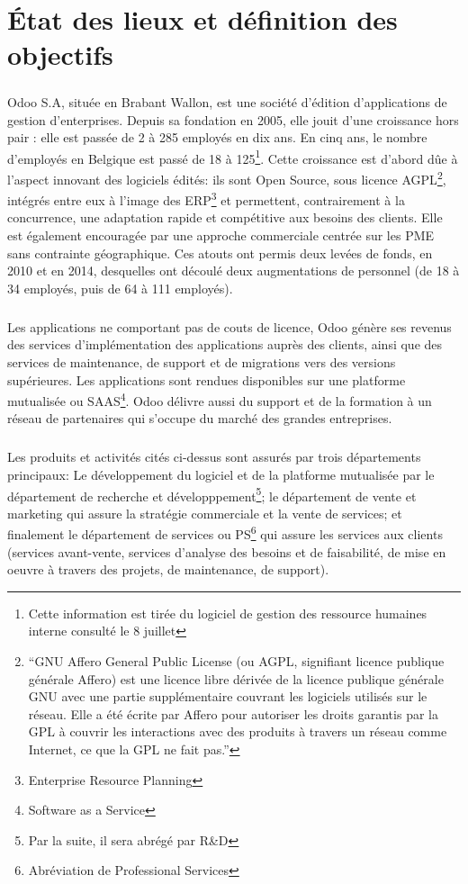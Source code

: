 \chapter{État des lieux et définition des objectifs}
\paragraph{}Odoo S.A, située en Brabant Wallon, est une société d’édition d'applications de gestion d'enterprises. Depuis sa fondation en 2005, elle jouit d'une croissance hors pair : elle est passée de 2 à 285 employés en dix ans. En cinq ans, le nombre d'employés en Belgique est passé de 18 à 125\footnote{Cette information est tirée du logiciel de gestion des ressource humaines interne consulté le 8 juillet}. Cette croissance est d'abord dûe à l’aspect innovant des logiciels édités: ils sont Open Source, sous licence AGPL\footnote{\enquote{GNU Affero General Public License (ou AGPL, signifiant licence publique générale Affero) est une licence libre dérivée de la licence publique générale GNU avec une partie supplémentaire couvrant les logiciels utilisés sur le réseau. Elle a été écrite par Affero pour autoriser les droits garantis par la GPL à couvrir les interactions avec des produits à travers un réseau comme Internet, ce que la GPL ne fait pas.}\cite{agpl}}, intégrés entre eux à l'image des ERP\footnote{Enterprise Resource Planning\cite{wikierp}} et permettent, contrairement à la concurrence, une adaptation rapide et compétitive aux besoins des clients. Elle est également encouragée par une approche commerciale centrée sur les PME sans contrainte géographique. Ces atouts ont permis deux levées de fonds, en 2010 et en 2014, desquelles ont découlé deux augmentations de personnel (de 18 à 34 employés, puis de 64 à 111 employés). 

\paragraph{}Les applications ne comportant pas de couts de licence, Odoo génère ses revenus des services d’implémentation des applications auprès des clients, ainsi que des services de maintenance, de support et de migrations vers des versions supérieures. Les applications sont rendues disponibles sur une platforme mutualisée ou SAAS\footnote{Software as a Service}. Odoo délivre aussi du support et de la formation à un réseau de partenaires qui s'occupe du marché des grandes entreprises. 


\paragraph{}Les produits et activités cités ci-dessus sont assurés par trois départements principaux: Le développement du logiciel et de la platforme mutualisée par le département de recherche et développpement\footnote{Par la suite, il sera abrégé par R\&D}; le département de vente et marketing qui assure la stratégie commerciale et la vente de services; et finalement le département de services ou PS\footnote{Abréviation de Professional Services} qui assure les services aux clients (services avant-vente, services d’analyse des besoins et de faisabilité, de mise en oeuvre à travers des projets, de maintenance, de support). 

